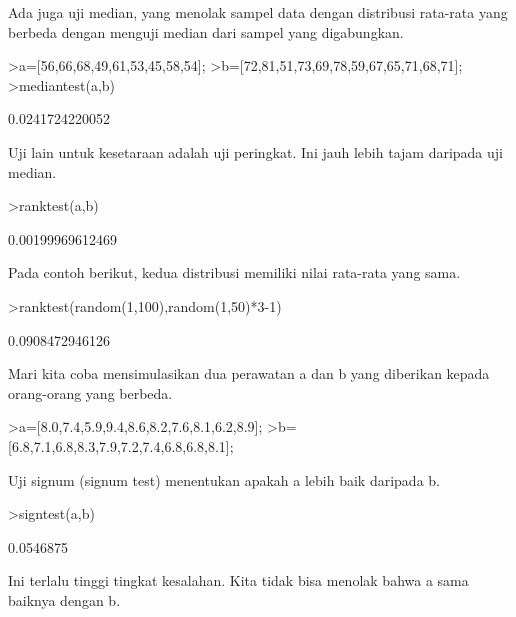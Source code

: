 \documentclass[a4paper,10pt]{article}
\begin{document}
\begin{eulernotebook}
\begin{eulercomment}
\begin{eulercomment}
\begin{eulercomment}
Ada juga uji median, yang menolak sampel data dengan distribusi
rata-rata yang berbeda dengan menguji median dari sampel yang
digabungkan.
\end{eulercomment}
\begin{eulerprompt}
>a=[56,66,68,49,61,53,45,58,54];
>b=[72,81,51,73,69,78,59,67,65,71,68,71];
>mediantest(a,b)
\end{eulerprompt}
\begin{euleroutput}
  0.0241724220052
\end{euleroutput}
\begin{eulercomment}
Uji lain untuk kesetaraan adalah uji peringkat. Ini jauh lebih tajam
daripada uji median.
\end{eulercomment}
\begin{eulerprompt}
>ranktest(a,b)
\end{eulerprompt}
\begin{euleroutput}
  0.00199969612469
\end{euleroutput}
\begin{eulercomment}
Pada contoh berikut, kedua distribusi memiliki nilai rata-rata yang
sama.
\end{eulercomment}
\begin{eulerprompt}
>ranktest(random(1,100),random(1,50)*3-1)
\end{eulerprompt}
\begin{euleroutput}
  0.0908472946126
\end{euleroutput}
\begin{eulercomment}
Mari kita coba mensimulasikan dua perawatan a dan b yang diberikan
kepada orang-orang yang berbeda.
\end{eulercomment}
\begin{eulerprompt}
>a=[8.0,7.4,5.9,9.4,8.6,8.2,7.6,8.1,6.2,8.9];
>b=[6.8,7.1,6.8,8.3,7.9,7.2,7.4,6.8,6.8,8.1];
\end{eulerprompt}
\begin{eulercomment}
Uji signum (signum test) menentukan apakah a lebih baik daripada b.
\end{eulercomment}
\begin{eulerprompt}
>signtest(a,b)
\end{eulerprompt}
\begin{euleroutput}
  0.0546875
\end{euleroutput}
\begin{eulercomment}
Ini terlalu tinggi tingkat kesalahan. Kita tidak bisa menolak bahwa a
sama baiknya dengan b.


\end{eulercomment}
\end{eulercomment}
\end{eulercomment}
\end{eulernotebook}
\end{document}
